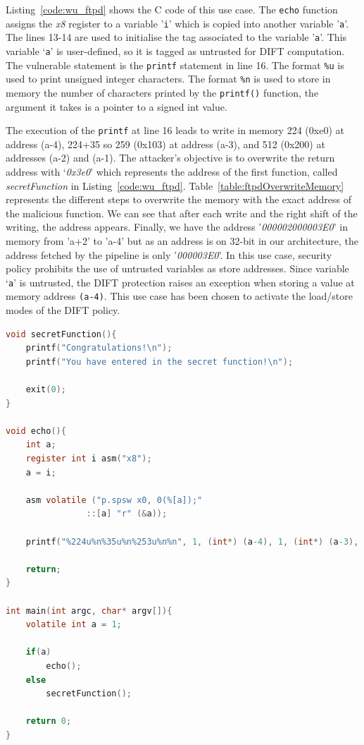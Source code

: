 Listing~\ref{code:wu_ftpd} shows the C code of this use case. The \texttt{echo} function assigns the \textit{x8} register to a variable '\verb|i|' which is copied into another variable '\verb|a|'.
The lines 13-14 are used to initialise the tag associated to the variable '\verb|a|'. This variable `\verb|a|' is user-defined, so it is tagged as untrusted for DIFT computation.
The vulnerable statement is the \verb|printf| statement in line 16.
The format \verb|%u| is used to print unsigned integer characters.
The format \verb|%n| is used to store in memory the number of characters printed by the \verb|printf()| function, the argument it takes is a pointer to a signed int value. 

The execution of the \verb|printf| at line 16 leads to write in memory 224 (0xe0) at address (a-4), 224+35 so 259 (0x103) at address (a-3), and 512 (0x200) at addresses (a-2) and (a-1). The attacker's objective is to overwrite the return address with `\textit{0x3e0}' which represents the address of the first function, called \textit{secretFunction} in Listing~\ref{code:wu_ftpd}.
Table~\ref{table:ftpdOverwriteMemory} represents the different steps to overwrite the memory with the exact address of the malicious function. We can see that after each write and the right shift of the writing, the address appears. Finally, we have the address '\textit{000002000003E0}' in memory from 'a+2' to 'a-4' but as an address is on 32-bit in our architecture, the address fetched by the pipeline is only '\textit{000003E0}'.
In this use case, security policy prohibits the use of untrusted variables as store addresses. Since variable `\verb|a|' is untrusted, the DIFT protection raises an exception when storing a value at memory address \verb|(a-4)|. This use case has been chosen to activate the load/store modes of the DIFT policy. 

\begin{lstlisting}[style=topPosition, language=C,label=code:wu_ftpd, caption=WU-FTPd C code]
void secretFunction(){
    printf("Congratulations!\n");
    printf("You have entered in the secret function!\n");

    exit(0);
}

void echo(){
    int a;
    register int i asm("x8");
    a = i;

    asm volatile ("p.spsw x0, 0(%[a]);"                
                ::[a] "r" (&a));

    printf("%224u%n%35u%n%253u%n%n", 1, (int*) (a-4), 1, (int*) (a-3), 1, (int*) (a-2), (int*) (a-1));

    return;
}

int main(int argc, char* argv[]){ 
    volatile int a = 1;

    if(a)
        echo();
    else
        secretFunction();

    return 0;
}\end{lstlisting}

